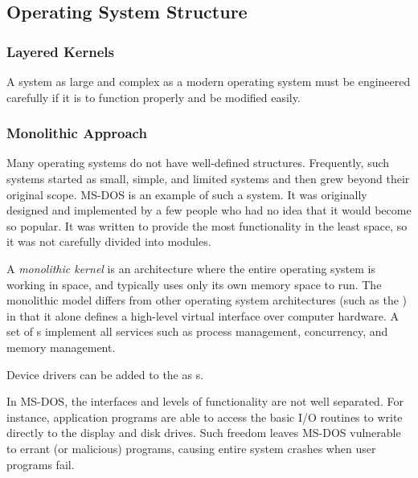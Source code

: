 \subsection{Operating System Structure}\label{subsec:OS_Structure}
\subsubsection{Layered Kernels}\label{subsubsec:Layered_Kernels}
A system as large and complex as a modern operating system must be engineered carefully if it is to function properly and be modified easily.

\subsubsection{Monolithic Approach}\label{subsubsec:Monolithic_Approach}
Many operating systems do not have well-defined structures.
Frequently, such systems started as small, simple, and limited systems and then grew beyond their original scope.
MS-DOS is an example of such a system.
It was originally designed and implemented by a few people who had no idea that it would become so popular.
It was written to provide the most functionality in the least space, so it was not carefully divided into modules.

\begin{definition}\label{def:Monolithic_Kernel}
  A \emph{monolithic kernel} is an  architecture where the entire operating system is working in  space, and typically uses only its own memory space to run.
  The monolithic model differs from other operating system architectures (such as the ) in that it alone defines a high-level virtual interface over computer hardware.
  A set of s implement all  services such as process management, concurrency, and memory management.

  Device drivers can be added to the  as s.
\end{definition}

In MS-DOS, the interfaces and levels of functionality are not well separated.
For instance, application programs are able to access the basic I/O routines to write directly to the display and disk drives.
Such freedom leaves MS-DOS vulnerable to errant (or malicious) programs, causing entire system crashes when user programs fail.

